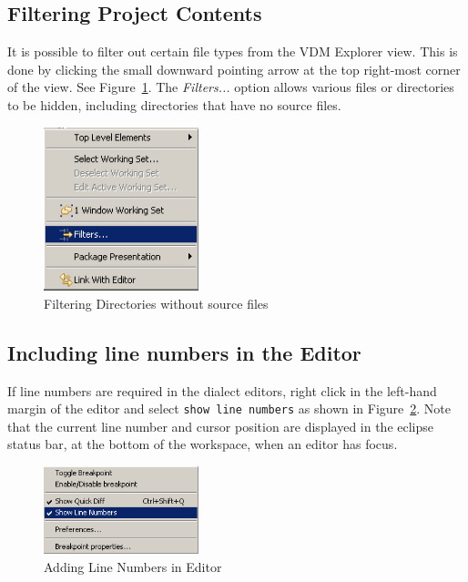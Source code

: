 \documentclass{overturerepchap}
\begin{document}
\subsection{Filtering Project Contents}

It is possible to filter out certain file types from the VDM Explorer view.
This is done by clicking the small downward pointing arrow at the top
right-most corner of the view. See
Figure~\ref{fig:filteringfiles}. The \emph{Filters...} option allows
various files or directories to be hidden, including
directories that have no source files.

\begin{figure}[!htb]
\begin{center}
\includegraphics[width=0.4\textwidth]{screenDumps/filteringfiles}
\caption{Filtering Directories without source files\label{fig:filteringfiles}}
\end{center}
\end{figure}

\subsection{Including line numbers in the Editor}

If line numbers are required in the dialect
editors, right click in the left-hand margin
of the editor and select \texttt{show line numbers} as shown in
Figure~\ref{fig:linenumbers}. Note that the current
line number and cursor position are displayed in the eclipse status
bar, at the bottom of the workspace, when an editor has focus.

\begin{figure}[!htb]
\begin{center}
\includegraphics[width=0.4\textwidth]{screenDumps/linenumbers}
\caption{Adding Line Numbers in Editor\label{fig:linenumbers}}
\end{center}
\end{figure}
\end{document}
